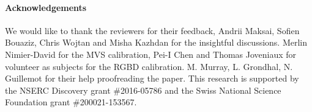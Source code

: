 \paragraph{Acknowledgements}
\begin{draft}
We would like to thank the reviewers for their feedback, Andrii Maksai, Sofien Bouaziz, Chris Wojtan and Misha Kazhdan for the insightful discussions. Merlin Nimier-David for the MVS calibration, Pei-I Chen and Thomas Joveniaux for volunteer as subjects for the RGBD calibration. M. Murray, L. Grondhal, N. Guillemot for their help proofreading the paper.
% 
This research is supported by the NSERC Discovery grant \#2016-05786 and the Swiss National Science Foundation grant \#200021-153567.
\end{draft}